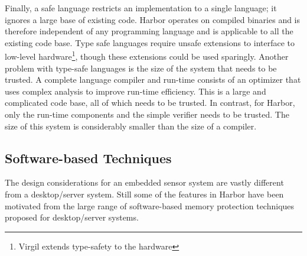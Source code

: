 Finally, a safe language restricts an implementation to a single
language; it ignores a large base of existing code.
%
Harbor operates on compiled binaries and is therefore independent of
any programming language and is applicable to all the existing code
base.
%
Type safe languages require unsafe extensions to interface to
low-level hardware\footnote{Virgil extends type-safety to the
  hardware}, though these extensions could be used sparingly.
%
Another problem with type-safe languages is the size of the system
that needs to be trusted.
%
A complete language compiler and run-time consists of an optimizer
that uses complex analysis to improve run-time efficiency.
%
This is a large and complicated code base, all of which needs to be
trusted.
%
In contrast, for Harbor, only the run-time components and the simple
verifier needs to be trusted.
%
The size of this system is considerably smaller than the size of a
compiler.
%
%
%
%
%
%
\subsection{Software-based Techniques}
%
The design considerations for an embedded sensor system are vastly
different from a desktop/server system.
%
Still some of the features in Harbor have been motivated from the
large range of software-based memory protection techniques proposed
for desktop/server systems.
%
